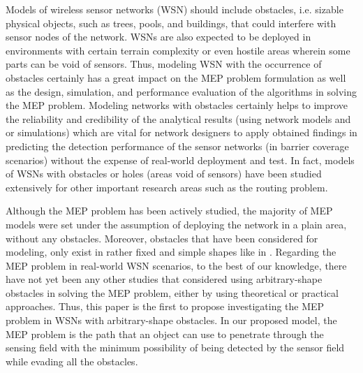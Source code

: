 \documentclass[final]{elsarticle}
\begin{document}
Models of wireless sensor networks (WSN) should include obstacles, i.e. sizable physical objects, such as trees, pools, and buildings, that could interfere with sensor nodes of the network. WSNs are also expected to be deployed in environments with certain terrain complexity or even hostile areas wherein some parts can be void of sensors. Thus, modeling WSN with the occurrence of obstacles certainly has a great impact on the MEP problem formulation as well as the design, simulation, and performance evaluation of the algorithms in solving the MEP problem. Modeling networks with obstacles certainly helps to improve the reliability and credibility of the analytical results (using network models and or simulations) which are vital for network designers to apply obtained findings in predicting the detection performance of the sensor networks (in barrier coverage scenarios) without the expense of real-world deployment and test. In fact, models of WSNs with obstacles or holes (areas void of sensors) have been studied extensively for other important research areas such as the routing problem.

Although the MEP problem has been actively studied, the majority of MEP models were set under the assumption of deploying the network in a plain area, without any obstacles. Moreover, obstacles that have been considered for modeling, only exist in rather fixed and simple shapes like in \cite{liu2017obstacle}. Regarding the MEP problem in real-world WSN scenarios, to the best of our knowledge, there have not yet been any other studies that considered using arbitrary-shape obstacles in solving the MEP problem, either by using theoretical or practical approaches. Thus, this paper is the first to propose investigating the MEP problem in WSNs with arbitrary-shape obstacles. In our proposed model, the MEP problem is the path that an object can use to penetrate through the sensing field with the minimum possibility of being detected by the sensor field while evading all the obstacles. 
\end{document}
